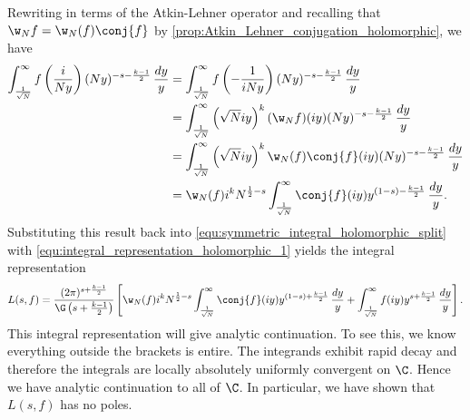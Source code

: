       Rewriting in terms of the Atkin-Lehner operator and recalling that $\w_{N}f = \w_{N}(f)\conj{f}$ by \cref{prop:Atkin_Lehner_conjugation_holomorphic}, we have
      \begin{align*}
        \int_{\frac{1}{\sqrt{N}}}^{\infty}f\left(\frac{i}{Ny}\right)(Ny)^{-s-\frac{k-1}{2}}\,\frac{dy}{y} &= \int_{\frac{1}{\sqrt{N}}}^{\infty}f\left(-\frac{1}{iNy}\right)(Ny)^{-s-\frac{k-1}{2}}\,\frac{dy}{y} \\
        &= \int_{\frac{1}{\sqrt{N}}}^{\infty}\left(\sqrt{N}iy\right)^{k}(\w_{N}f)(iy)(Ny)^{-s-\frac{k-1}{2}}\,\frac{dy}{y} \\
        &= \int_{\frac{1}{\sqrt{N}}}^{\infty}\left(\sqrt{N}iy\right)^{k}\w_{N}(f)\conj{f}(iy)(Ny)^{-s-\frac{k-1}{2}}\,\frac{dy}{y} \\
        &= \w_{N}(f)i^{k}N^{\frac{1}{2}-s}\int_{\frac{1}{\sqrt{N}}}^{\infty}\conj{f}(iy)y^{(1-s)-\frac{k-1}{2}}\,\frac{dy}{y}.
      \end{align*}
      Substituting this result back into \cref{equ:symmetric_integral_holomorphic_split} with \cref{equ:integral_representation_holomorphic_1} yields the integral representation
      \[
        L(s,f) = \frac{(2\pi)^{s+\frac{k-1}{2}}}{\G\left(s+\frac{k-1}{2}\right)}\left[\w_{N}(f)i^{k}N^{\frac{1}{2}-s}\int_{\frac{1}{\sqrt{N}}}^{\infty}\conj{f}(iy)y^{(1-s)+\frac{k-1}{2}}\,\frac{dy}{y}+\int_{\frac{1}{\sqrt{N}}}^{\infty}f(iy)y^{s+\frac{k-1}{2}}\,\frac{dy}{y}\right].
      \]
      This integral representation will give analytic continuation. To see this, we know everything outside the brackets is entire. The integrands exhibit rapid decay and therefore the integrals are locally absolutely uniformly convergent on $\C$. Hence we have analytic continuation to all of $\C$. In particular, we have shown that $L(s,f)$ has no poles.
